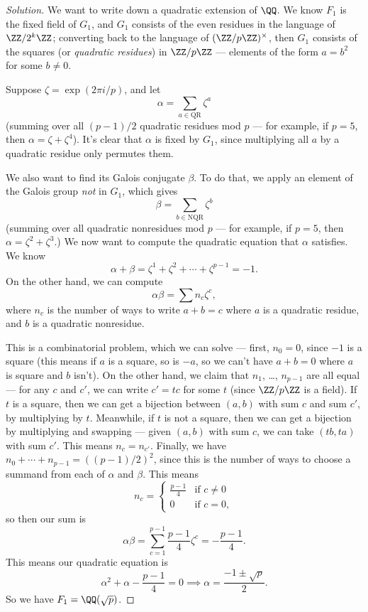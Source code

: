 \begin{proof}[Solution]
    We want to write down a quadratic extension of $\QQ$. We know $F_1$ is the fixed field of $G_1$, and $G_1$ consists of the even residues in the language of $\ZZ/2^k\ZZ$; converting back to the language of $(\ZZ/p\ZZ)^\times$, then $G_1$ consists of the squares (or \emph{quadratic residues}) in $\ZZ/p\ZZ$ --- elements of the form $a = b^2$ for some $b \neq 0$.
    
    Suppose $\zeta = \exp(2\pi i/p)$, and let \[\alpha = \sum_{a \in \text{QR}} \zeta^a\] (summing over all $(p - 1)/2$ quadratic residues mod $p$ --- for example, if $p = 5$, then $\alpha = \zeta + \zeta^4$). It's clear that $\alpha$ is fixed by $G_1$, since multiplying all $a$ by a quadratic residue only permutes them. 
    
    We also want to find its Galois conjugate $\beta$. To do that, we apply an element of the Galois group \emph{not} in $G_1$, which gives \[\beta = \sum_{b \in \text{NQR}} \zeta^b\] (summing over all quadratic nonresidues mod $p$ --- for example, if $p = 5$, then $\alpha = \zeta^2 + \zeta^3$.) 
    We now want to compute the quadratic equation that $\alpha$ satisfies. We know \[\alpha + \beta = \zeta^1 + \zeta^2 + \cdots + \zeta^{p - 1} = -1.\] On the other hand, we can compute \[\alpha \beta = \sum n_c\zeta^c,\] where $n_c$ is the number of ways to write $a + b = c$ where $a$ is a quadratic residue, and $b$ is a quadratic nonresidue. 
    
    This is a combinatorial problem, which we can solve --- first, $n_0 = 0$, since $-1$ is a square (this means if $a$ is a square, so is $-a$, so we can't have $a + b = 0$ where $a$ is square and $b$ isn't). On the other hand, we claim that $n_1$, \ldots, $n_{p - 1}$ are all equal --- for any $c$ and $c'$, we can write $c' = tc$ for some $t$ (since $\ZZ/p\ZZ$ is a field). If $t$ is a square, then we can get a bijection between $(a, b)$ with sum $c$ and sum $c'$, by multiplying by $t$. Meanwhile, if $t$ is not a square, then we can get a bijection by multiplying and swapping --- given $(a, b)$ with sum $c$, we can take $(tb, ta)$ with sum $c'$. This means $n_c = n_{c'}$. Finally, we have $n_0 + \cdots + n_{p - 1} = ((p - 1)/2)^2$, since this is the number of ways to choose a summand from each of $\alpha$ and $\beta$. This means \[n_c = \begin{cases} \frac{p - 1}{4} & \text{if $c \neq 0$} \\ 0 & \text{if $c = 0$},\end{cases}\] so then our sum is \[\alpha\beta = \sum_{c = 1}^{p - 1} \frac{p - 1}{4}\zeta^c = -\frac{p - 1}{4}.\] This means our quadratic equation is \[\alpha^2 + \alpha - \frac{p - 1}{4} = 0 \implies \alpha = \frac{-1 \pm \sqrt{p}}{2}.\] So we have $F_1 = \QQ(\sqrt{p})$.  
\end{proof}

